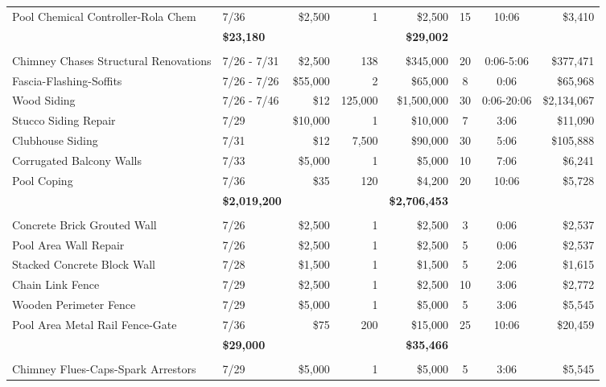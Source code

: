 \documentclass[11pt,letterpaper]{article}
\begin{document}
\begin{longtable}{p{4.2cm} p{1.6cm} r r r c c r}
\rowcolor{blue!12} Pool Chemical Controller-Rola Chem & 7/36 & \$2,500 & 1 & \$2,500 & 15 & 10:06 & \$3,410 \\
\addlinespace[1pt] \multicolumn{4}{r}{} & \textbf{\$23,180} & & & \textbf{\$29,002} \\
\addlinespace[6pt]
\multicolumn{8}{l}{\textbf{Exterior Surfaces}} \\
Chimney Chases Structural Renovations & 7/26 - 7/31 & \$2,500 & 138 & \$345,000 & 20 & 0:06-5:06 & \$377,471 \\
\rowcolor{blue!12} Fascia-Flashing-Soffits & 7/26 - 7/26 & \$55,000 & 2 & \$65,000 & 8 & 0:06 & \$65,968 \\
Wood Siding & 7/26 - 7/46 & \$12 & 125,000 & \$1,500,000 & 30 & 0:06-20:06 & \$2,134,067 \\
\rowcolor{blue!12} Stucco Siding Repair & 7/29 & \$10,000 & 1 & \$10,000 & 7 & 3:06 & \$11,090 \\
Clubhouse Siding & 7/31 & \$12 & 7,500 & \$90,000 & 30 & 5:06 & \$105,888 \\
\rowcolor{blue!12} Corrugated Balcony Walls & 7/33 & \$5,000 & 1 & \$5,000 & 10 & 7:06 & \$6,241 \\
Pool Coping & 7/36 & \$35 & 120 & \$4,200 & 20 & 10:06 & \$5,728 \\
\addlinespace[1pt] \multicolumn{4}{r}{} & \textbf{\$2,019,200} & & & \textbf{\$2,706,453} \\
\addlinespace[6pt]
\multicolumn{8}{l}{\textbf{Fences-Walls-Gates}} \\
\rowcolor{blue!12} Concrete Brick Grouted Wall & 7/26 & \$2,500 & 1 & \$2,500 & 3 & 0:06 & \$2,537 \\
Pool Area Wall Repair & 7/26 & \$2,500 & 1 & \$2,500 & 5 & 0:06 & \$2,537 \\
\rowcolor{blue!12} Stacked Concrete Block Wall & 7/28 & \$1,500 & 1 & \$1,500 & 5 & 2:06 & \$1,615 \\
Chain Link Fence & 7/29 & \$2,500 & 1 & \$2,500 & 10 & 3:06 & \$2,772 \\
\rowcolor{blue!12} Wooden Perimeter Fence & 7/29 & \$5,000 & 1 & \$5,000 & 5 & 3:06 & \$5,545 \\
Pool Area Metal Rail Fence-Gate & 7/36 & \$75 & 200 & \$15,000 & 25 & 10:06 & \$20,459 \\
\addlinespace[1pt] \multicolumn{4}{r}{} & \textbf{\$29,000} & & & \textbf{\$35,466} \\
\addlinespace[6pt]
\multicolumn{8}{l}{\textbf{Fire Safety}} \\
\rowcolor{blue!12} Chimney Flues-Caps-Spark Arrestors & 7/29 & \$5,000 & 1 & \$5,000 & 5 & 3:06 & \$5,545 \\

\end{longtable}
\end{document}
